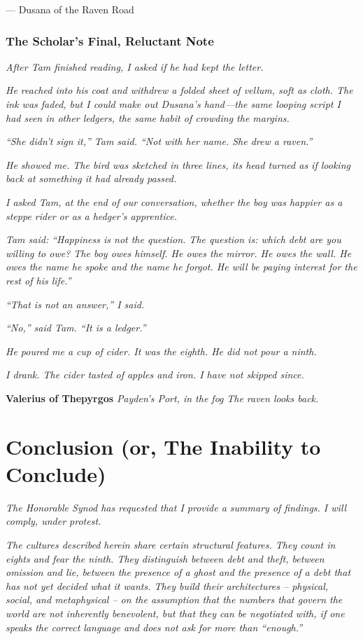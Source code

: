 \documentclass[12pt]{article}
\begin{document}
--- Dusana of the Raven Road

\subsubsection{The Scholar's Final, Reluctant Note}
\textit{After Tam finished reading, I asked if he had kept the letter.}

\textit{He reached into his coat and withdrew a folded sheet of vellum, soft as cloth. The ink was faded, but I could make out Dusana's hand---the same looping script I had seen in other ledgers, the same habit of crowding the margins.}

\textit{``She didn't sign it,'' Tam said. ``Not with her name. She drew a raven.''}

\textit{He showed me. The bird was sketched in three lines, its head turned as if looking back at something it had already passed.}

\textit{I asked Tam, at the end of our conversation, whether the boy was happier as a steppe rider or as a hedger's apprentice.}

\textit{Tam said: ``Happiness is not the question. The question is: which debt are you willing to owe? The boy owes himself. He owes the mirror. He owes the wall. He owes the name he spoke and the name he forgot. He will be paying interest for the rest of his life.''}

\textit{``That is not an answer,'' I said.}

\textit{``No,'' said Tam. ``It is a ledger.''}

\textit{He poured me a cup of cider. It was the eighth. He did not pour a ninth.}

\textit{I drank. The cider tasted of apples and iron. I have not skipped since.}

\textbf{Valerius of Thepyrgos}
\textit{Payden's Port, in the fog}
\textit{The raven looks back.}

\section{Conclusion (or, The Inability to Conclude)}
\textit{The Honorable Synod has requested that I provide a summary of findings. I will comply, under protest.}

\textit{The cultures described herein share certain structural features. They count in eights and fear the ninth. They distinguish between debt and theft, between omission and lie, between the presence of a ghost and the presence of a debt that has not yet decided what it wants. They build their architectures -- physical, social, and metaphysical -- on the assumption that the numbers that govern the world are not inherently benevolent, but that they can be negotiated with, if one speaks the correct language and does not ask for more than ``enough.''}
\end{document}

